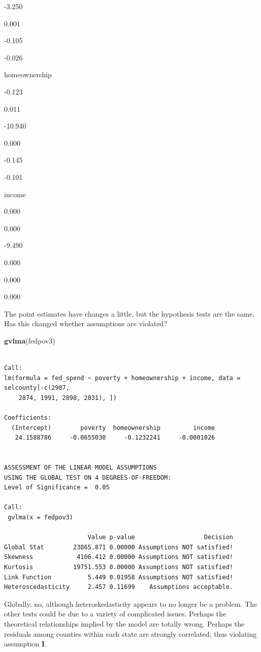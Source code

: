 \documentclass[
]{book}
\makeatletter
\newenvironment{Shaded}{\begin{snugshade}}{\end{snugshade}}
\newcommand{\FunctionTok}[1]{\textcolor[rgb]{0.27,0.27,0.27}{\textbf{#1}}}
\newcommand{\NormalTok}[1]{#1}
\newenvironment{kframe}{%
\medskip{}
\setlength{\fboxsep}{.8em}
 \def\at@end@of@kframe{}%
 \ifinner\ifhmode%
  \def\at@end@of@kframe{\end{minipage}}%
  \begin{minipage}{\columnwidth}%
 \fi\fi%
 \def\FrameCommand##1{\hskip\@totalleftmargin \hskip-\fboxsep
 \colorbox{shadecolor}{##1}\hskip-\fboxsep
     \hskip-\linewidth \hskip-\@totalleftmargin \hskip\columnwidth}%
 \MakeFramed {\advance\hsize-\width
   \@totalleftmargin\z@ \linewidth\hsize
   \@setminipage}}%
 {\par\unskip\endMakeFramed%
 \at@end@of@kframe}
\renewenvironment{Shaded}{\begin{kframe}}{\end{kframe}}
\makeatother
\begin{document}
-3.250

0.001

-0.105

-0.026

homeownership

-0.123

0.011

-10.940

0.000

-0.145

-0.101

income

0.000

0.000

-9.490

0.000

0.000

0.000

The point estimates have changes a little, but the hypothesis tests are the same. Has this changed whether assumptions are violated?

\begin{Shaded}
\begin{Highlighting}[]
\FunctionTok{gvlma}\NormalTok{(fedpov3)}
\end{Highlighting}
\end{Shaded}

\begin{verbatim}

Call:
lm(formula = fed_spend ~ poverty + homeownership + income, data = selcounty[-c(2907, 
    2874, 1991, 2898, 2831), ])

Coefficients:
  (Intercept)        poverty  homeownership         income  
   24.1588786     -0.0655030     -0.1232241     -0.0001026  


ASSESSMENT OF THE LINEAR MODEL ASSUMPTIONS
USING THE GLOBAL TEST ON 4 DEGREES-OF-FREEDOM:
Level of Significance =  0.05 

Call:
 gvlma(x = fedpov3) 

                       Value p-value                   Decision
Global Stat        23865.871 0.00000 Assumptions NOT satisfied!
Skewness            4106.412 0.00000 Assumptions NOT satisfied!
Kurtosis           19751.553 0.00000 Assumptions NOT satisfied!
Link Function          5.449 0.01958 Assumptions NOT satisfied!
Heteroscedasticity     2.457 0.11699    Assumptions acceptable.
\end{verbatim}

Globally, no, although heteroskedasticity appears to no longer be a problem. The other tests could be due to a variety of complicated issues. Perhaps the theoretical relationships implied by the model are totally wrong. Perhaps the residuals among counties within each state are strongly correlated, thus violating assumption \textbf{I}.
\end{document}
